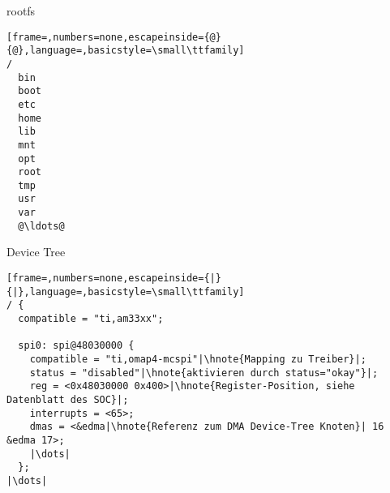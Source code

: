 \begin{frame}[fragile]{rootfs}
	\begin{lstlisting}[frame=,numbers=none,escapeinside={@}{@},language=,basicstyle=\small\ttfamily]
/
  bin
  boot
  etc
  home
  lib
  mnt
  opt
  root
  tmp
  usr
  var
  @\ldots@
	\end{lstlisting}
\end{frame}

\begin{frame}[fragile]{Device Tree}
	\begin{lstlisting}[frame=,numbers=none,escapeinside={|}{|},language=,basicstyle=\small\ttfamily]
/ {
  compatible = "ti,am33xx";

  spi0: spi@48030000 {
    compatible = "ti,omap4-mcspi"|\hnote{Mapping zu Treiber}|;
    status = "disabled"|\hnote{aktivieren durch status="okay"}|;
    reg = <0x48030000 0x400>|\hnote{Register-Position, siehe Datenblatt des SOC}|;
    interrupts = <65>;
    dmas = <&edma|\hnote{Referenz zum DMA Device-Tree Knoten}| 16 &edma 17>;
    |\dots|
  };
|\dots|
	\end{lstlisting}
\end{frame}

